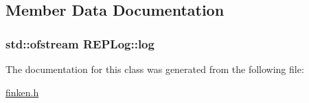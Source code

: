 \subsection{Member Data Documentation}
\subsubsection[{\texorpdfstring{log}{log}}]{\setlength{\rightskip}{0pt plus 5cm}std\+::ofstream R\+E\+P\+Log\+::log\hspace{0.3cm}{\ttfamily [private]}}\hypertarget{classREPLog_a7eed80bb4d53d6d19882e3a43c0b99d6}{}\label{classREPLog_a7eed80bb4d53d6d19882e3a43c0b99d6}


The documentation for this class was generated from the following file\+:\begin{DoxyCompactItemize}
\item 
\hyperlink{finken_8h}{finken.\+h}\end{DoxyCompactItemize}
